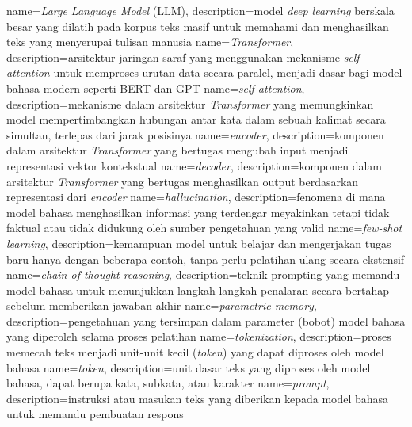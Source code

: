 {
	name={\textit{Large Language Model} (LLM)},
	description={model \textit{deep learning} berskala besar yang dilatih pada korpus teks masif untuk memahami dan menghasilkan teks yang menyerupai tulisan manusia}
}
{
	name={\textit{Transformer}},
	description={arsitektur jaringan saraf yang menggunakan mekanisme \textit{self-attention} untuk memproses urutan data secara paralel, menjadi dasar bagi model bahasa modern seperti BERT dan GPT}
}
{
	name={\textit{self-attention}},
	description={mekanisme dalam arsitektur \textit{Transformer} yang memungkinkan model mempertimbangkan hubungan antar kata dalam sebuah kalimat secara simultan, terlepas dari jarak posisinya}
}
{
	name={\textit{encoder}},
	description={komponen dalam arsitektur \textit{Transformer} yang bertugas mengubah input menjadi representasi vektor kontekstual}
}
{
	name={\textit{decoder}},
	description={komponen dalam arsitektur \textit{Transformer} yang bertugas menghasilkan output berdasarkan representasi dari \textit{encoder}}
}
{
	name={\textit{hallucination}},
	description={fenomena di mana model bahasa menghasilkan informasi yang terdengar meyakinkan tetapi tidak faktual atau tidak didukung oleh sumber pengetahuan yang valid}
}
{
	name={\textit{few-shot learning}},
	description={kemampuan model untuk belajar dan mengerjakan tugas baru hanya dengan beberapa contoh, tanpa perlu pelatihan ulang secara ekstensif}
}
{
	name={\textit{chain-of-thought reasoning}},
	description={teknik prompting yang memandu model bahasa untuk menunjukkan langkah-langkah penalaran secara bertahap sebelum memberikan jawaban akhir}
}
{
	name={\textit{parametric memory}},
	description={pengetahuan yang tersimpan dalam parameter (bobot) model bahasa yang diperoleh selama proses pelatihan}
}
{
	name={\textit{tokenization}},
	description={proses memecah teks menjadi unit-unit kecil (\textit{token}) yang dapat diproses oleh model bahasa}
}
{
	name={\textit{token}},
	description={unit dasar teks yang diproses oleh model bahasa, dapat berupa kata, subkata, atau karakter}
}
{
	name={\textit{prompt}},
	description={instruksi atau masukan teks yang diberikan kepada model bahasa untuk memandu pembuatan respons}
}

